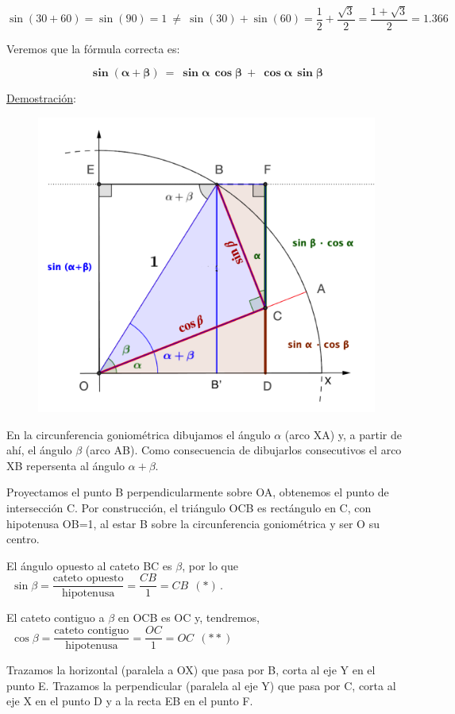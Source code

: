 $\sin (30+60)=\sin (90)=1 \ \boldsymbol{\neq} \ \sin (30)+\sin (60)=\dfrac 1 2 + \dfrac {\sqrt{3}}{2}=\dfrac{1+\sqrt{3}}{2}=1.366$

\vspace{2mm}Veremos que la fórmula correcta es:

\vspace{5mm}
\begin{theorem}

$$\boldsymbol{ \sin(\alpha+\beta) \ = \ \sin \alpha \, \cos \beta \ + \ \cos \alpha \, \sin \beta  }$$	
\end{theorem}

\underline{Demostración}:

\begin{figure}[H]
	\centering
	\includegraphics[width=.5\textwidth]{img-ft/ft02.png}
	\end{figure}

\vspace{-10mm}
En la circunferencia goniométrica dibujamos el ángulo $\alpha$ (arco XA) y, a partir de ahí, el ángulo $\beta$ (arco AB). Como consecuencia de dibujarlos consecutivos el arco XB repersenta al ángulo $\alpha + \beta$.

Proyectamos el punto B perpendicularmente sobre OA, obtenemos el punto de intersección C. Por construcción, el triángulo OCB es rectángulo en C, con hipotenusa OB=1, al estar B sobre la circunferencia goniométrica y ser O su centro. 

El ángulo opuesto al cateto BC es $\beta$, por lo que 
$\ \ \sin \beta=\dfrac{\text{cateto opuesto}}{\text{hipotenusa}}=\dfrac{CB}{1}=CB \ \ (*)\, . \ $ 

El cateto contiguo a $\beta$ en OCB es OC y, tendremos, $\ \ \cos \beta=\dfrac{\text{cateto contiguo}}{\text{hipotenusa}}=\dfrac {OC}{1}=OC \ \ (**)$

Trazamos la horizontal (paralela a OX) que pasa por B, corta al eje Y en el punto E. Trazamos la perpendicular (paralela al eje Y) que pasa por C, corta al eje X en el punto D y a la recta EB en el punto F.

